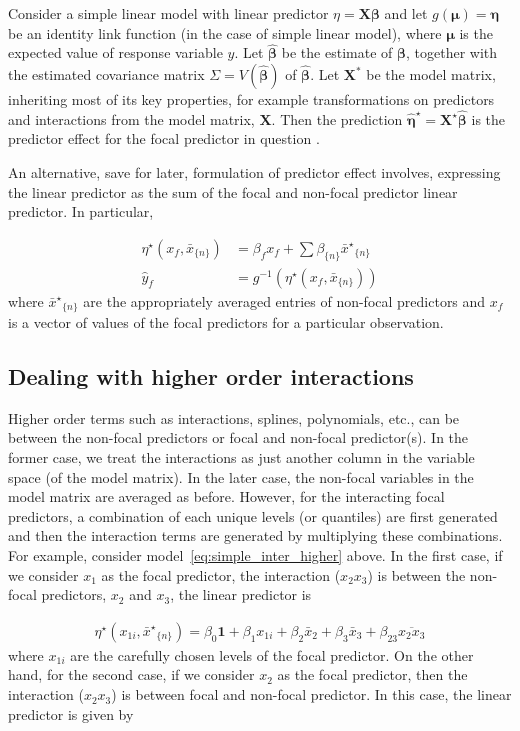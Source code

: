 \documentclass[10pt,letterpaper]{article}
\newcommand{\bX}{{\mathbf X}}
\newcommand{\bbeta}{{\boldsymbol \beta}}
\newcommand{\boldeta}{{\boldsymbol \eta}}
\newcommand{\boldmu}{{\boldsymbol \mu}}
\newcommand{\nset}[1]{#1_{\{n\}}}
\let\over=\overline
\begin{document}
Consider a simple linear model with linear predictor $\eta = \bX\bbeta$ and let $g(\boldmu) = \boldeta$ be an identity link function (in the case of simple linear model), where $\boldmu$ is the expected value of response variable $y$. Let $\hat{\bbeta}$ be the estimate of $\bbeta$, together with the estimated covariance matrix $\Sigma = V(\hat{\bbeta})$ of $\hat{\bbeta}$. Let $\mathbf{X^*}$ be the model matrix, inheriting most of its key properties, for example transformations on predictors and interactions from the model matrix, $\mathbf{X}$. Then the prediction $\hat{\boldeta}^\star = \bX^\star\hat{\bbeta}$ is the predictor effect for the focal predictor in question \cite{fox2009effect}.

An alternative, save for later, formulation of predictor effect involves, expressing the linear predictor as the sum of the focal and non-focal predictor linear predictor. In particular, 

\begin{align}\label{eq:eta_mean}
\eta^\star(x_f, \nset{{\bar{x}}}) &= \beta_f x_f + \sum \nset{\beta} \nset{{\bar{x}^\star}} \\
\hat{y}_f  &= g^{-1} \left(\eta^\star(x_f, \nset{{\bar{x}}})\right)
\end{align}
where $\nset{{\bar{x}^\star}}$ are the appropriately averaged entries of non-focal predictors and $x_f$ is a vector of values of the focal predictors for a particular observation.


\subsection*{Dealing with higher order interactions}

Higher order terms such as interactions, splines, polynomials, etc., can be between the non-focal predictors or focal and non-focal predictor(s). In the former case, we treat the interactions as just another column in the variable space (of the model matrix). In the later case, the non-focal variables in the model matrix are averaged as before. However, for the interacting focal predictors, a combination of each unique levels (or quantiles) are first generated and then the interaction terms are generated by multiplying these combinations. For example, consider model~\ref{eq:simple_inter_higher} above. In the first case, if we consider $x_1$ as the focal predictor, the interaction ($x_2x_3$) is between the non-focal predictors, $x_2$ and $x_3$, the linear predictor is

\begin{align*}
\eta^\star(x_{1i}, \nset{{\bar{x}^\star}}) = \beta_0\mathbf{1} + \beta_1 x_{1i} + \beta_2\bar{x}_2 + \beta_3\bar{x}_3 + \beta_{23}\over{x_2x_3}
\end{align*}
where $x_{1i}$ are the carefully chosen levels of the focal predictor. On the other hand, for the second case, if we consider $x_2$ as the focal predictor, then the interaction ($x_2x_3$) is between focal and non-focal predictor. In this case, the linear predictor is given by
\end{document}

